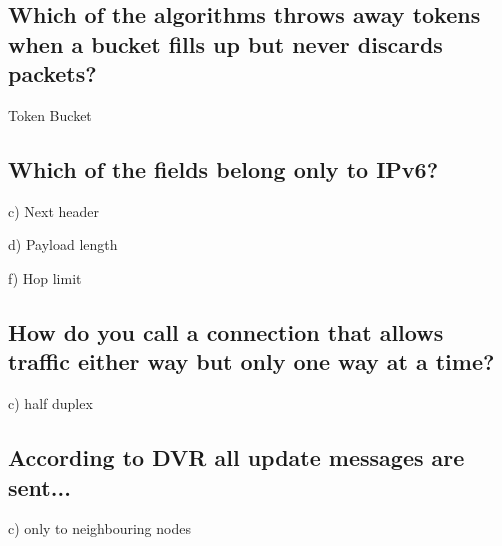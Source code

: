 \documentclass[a4paper,
			llpt,
			solution,
			accentcolor=tud2d,
			colorbacktitle
			]
			{tudexercise}
\newcommand{\8}{$\infty$}
\begin{document}
\subsection{Which of the algorithms throws away tokens when a bucket fills up but never discards packets?}
\begin{compactenum}
\item Token Bucket
\end{compactenum}
\subsection{Which of the fields belong only to IPv6?}
\begin{compactenum}
\item[c)] Next header
\item[d)] Payload length
\item[f)] Hop limit
\end{compactenum}
\subsection{How do you call a connection that allows traffic either way but only one way at a time?}
\begin{compactenum}
\item[c)]{half duplex}
\end{compactenum}
\subsection{According to DVR all update messages are sent...}
\begin{compactenum}
\item[c)]{only to neighbouring nodes}
\end{compactenum}
\end{document}
